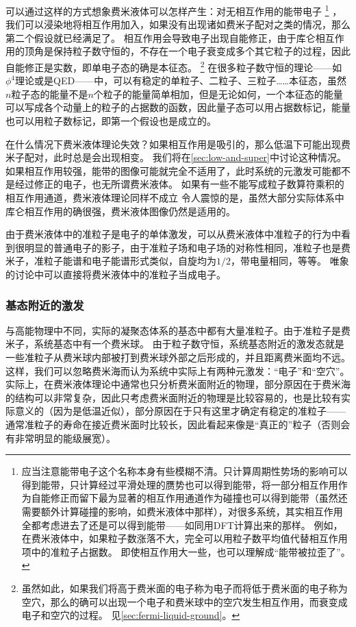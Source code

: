 可以通过这样的方式想象费米液体可以怎样产生：对无相互作用的能带电子%
\footnote{
    应当注意能带电子这个名称本身有些模糊不清。只计算周期性势场的影响可以得到能带，只计算经过平滑处理的赝势也可以得到能带，将一部分相互作用作为自能修正而留下最为显著的相互作用通道作为碰撞也可以得到能带（虽然还需要额外计算碰撞的影响，如费米液体中那样），对很多系统，其实相互作用全都考虑进去了还是可以得到能带——如同用DFT计算出来的那样。
    例如，在费米液体中，如果粒子数涨落不大，完全可以用粒子数平均值代替相互作用项中的准粒子占据数。
    即使相互作用大一些，也可以理解成“能带被拉歪了”。
}%
，我们可以浸染地将相互作用加入，如果没有出现诸如费米子配对之类的情况，那么第二个假设就已经满足了。
相互作用会导致电子出现自能修正，由于库仑相互作用的顶角是保持粒子数守恒的，不存在一个电子衰变成多个其它粒子的过程，因此自能修正是实数，即单电子态的确是本征态。%
\footnote{
    虽然如此，如果我们将高于费米面的电子称为电子而将低于费米面的电子称为空穴，那么的确可以出现一个电子和费米球中的空穴发生相互作用，而衰变成电子和空穴的过程。
    见\autoref{sec:fermi-liquid-ground}。
}%
在很多粒子数守恒的理论——如$\phi^4$理论或是QED——中，可以有稳定的单粒子、二粒子、三粒子……本征态，虽然$n$粒子态的能量不是$n$个粒子的能量简单相加，但是无论如何，一个本征态的能量可以写成各个动量上的粒子的占据数的函数，因此量子态可以用占据数标记，能量也可以用粒子数标记，即第一个假设也是成立的。

在什么情况下费米液体理论失效？如果相互作用是吸引的，那么低温下可能出现费米子配对，此时总是会出现相变。
我们将在\autoref{sec:low-and-super}中讨论这种情况。
如果相互作用较强，能带的图像可能就完全不适用了，此时系统的元激发可能都不是经过修正的电子，也无所谓费米液体。
如果有一些不能写成粒子数算符乘积的相互作用通道，费米液体理论同样不成立
令人震惊的是，虽然大部分实际体系中库仑相互作用的确很强，费米液体图像仍然是适用的。

由于费米液体中的准粒子是电子的单体激发，可以从费米液体中准粒子的行为中看到很明显的普通电子的影子，由于准粒子场和电子场的对称性相同，准粒子也是费米子，准粒子能谱和电子能谱形式类似，自旋均为$1/2$，带电量相同，等等。
唯象的讨论中可以直接将费米液体中的准粒子当成电子。

\subsubsection{基态附近的激发}\label{sec:fermi-liquid-ground}

与高能物理中不同，实际的凝聚态体系的基态中都有大量准粒子。由于准粒子是费米子，系统基态中有一个费米球。
由于粒子数守恒，系统基态附近的激发态就是一些准粒子从费米球内部被打到费米球外部之后形成的，并且距离费米面均不远。
这样，我们可以忽略费米海而认为系统中实际上有两种元激发：“电子”和“空穴”。
实际上，在费米液体理论中通常也只分析费米面附近的物理，部分原因在于费米海的结构可以非常复杂，因此只考虑费米面附近的物理是比较容易的，也是比较有实际意义的（因为是低温近似），部分原因在于只有这里才确定有稳定的准粒子——通常准粒子的寿命在接近费米面时比较长，因此看起来像是“真正的”粒子（否则会有非常明显的能级展宽）。

